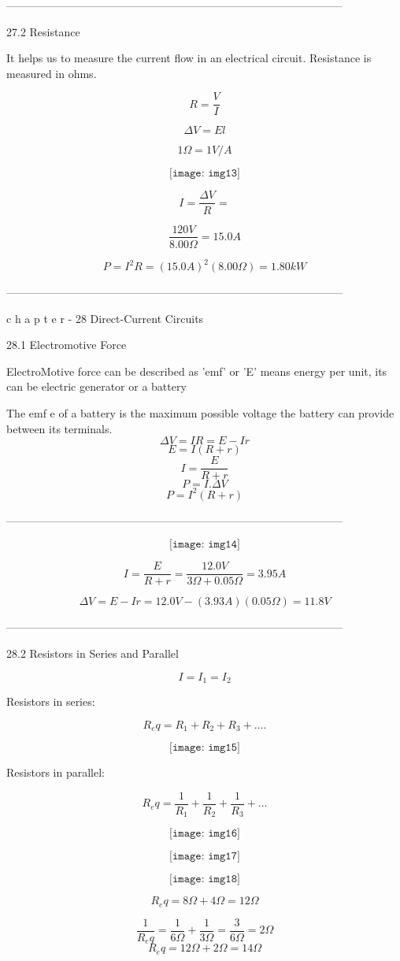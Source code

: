 \documentclass[11pt] {article}
\begin{document}
--------------------------------------------------------------------------------------------
\begin{center}
27.2 Resistance
\end{center}
It helps us to measure the current flow in an electrical circuit. Resistance is measured in ohms.

$$R = \frac{V}{I}$$

$$\Delta{V} = El$$

$${1}\Omega = 1V/A$$

$$\texttt{[image: img13]}$$

$$I = \frac{\Delta{V}}{R} = $$

$$\frac{120V}{{8.00}\Omega} = 15.0 A$$

$$P = I^2 R = (15.0A)^2({8.00}\Omega) = 1.80kW$$

--------------------------------------------------------------------------------------------

c h a p t e r - 28 Direct-Current Circuits
\begin{center}
28.1 Electromotive Force
\end{center}
ElectroMotive force can be described as 'emf' or 'E' means energy per unit, its can be electric generator or a battery

The emf e of a battery is the maximum possible voltage the battery can provide between its terminals.
$${\Delta{V}} = IR = E - Ir$$
$$E = I(R+r)$$
$$I = \frac{E}{R+r}$$
$$P = I . \Delta{V}$$
$$P = I^2(R + r)$$

--------------------------------------------------------------------------------------------

$$\texttt{[image: img14]}$$

$$I = \frac{E}{R+ r} = \frac{12.0V}{{3}\Omega + {0.05}\Omega} = 3.95A$$

$$\Delta{V} = E - Ir = 12.0V - (3.93A)({0.05}\Omega) = 11.8V$$

--------------------------------------------------------------------------------------------

28.2 Resistors in Series and Parallel 

$$I = I_1 = I_2$$

Resistors in series:

$$R_eq = R_1 + R_2 + R_3 + ....$$

$$\texttt{[image: img15]}$$

Resistors in parallel:

$$R_eq = \frac{1}{R_1} + \frac{1}{R_2} + \frac{1}{R_3} + ...$$

$$\texttt{[image: img16]}$$

$$\texttt{[image: img17]}$$

$$\texttt{[image: img18]}$$

$$R_eq = {8}\Omega + {4}\Omega = {12}\Omega$$

$$\frac{1}{R_eq} = \frac{1}{{6}\Omega} + \frac{1}{{3}\Omega} = \frac{3}{{6}\Omega} = {2}\Omega$$
$$R_eq = {12}\Omega + {2}\Omega = {14}\Omega$$
\end{document}
